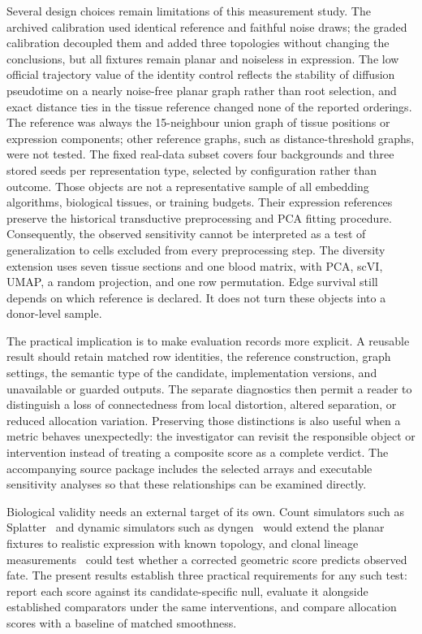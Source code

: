 \documentclass[11pt]{article}
\begin{document}
Several design choices remain limitations of this measurement study. The archived calibration used identical reference and faithful noise draws; the graded calibration decoupled them and added three topologies without changing the conclusions, but all fixtures remain planar and noiseless in expression. The low official trajectory value of the identity control reflects the stability of diffusion pseudotime on a nearly noise-free planar graph rather than root selection, and exact distance ties in the tissue reference changed none of the reported orderings. The reference was always the 15-neighbour union graph of tissue positions or expression components; other reference graphs, such as distance-threshold graphs, were not tested. The fixed real-data subset covers four backgrounds and three stored seeds per representation type, selected by configuration rather than outcome. Those objects are not a representative sample of all embedding algorithms, biological tissues, or training budgets. Their expression references preserve the historical transductive preprocessing and PCA fitting procedure. Consequently, the observed sensitivity cannot be interpreted as a test of generalization to cells excluded from every preprocessing step. The diversity extension uses seven tissue sections and one blood matrix, with PCA, scVI, UMAP, a random projection, and one row permutation. Edge survival still depends on which reference is declared. It does not turn these objects into a donor-level sample.

The practical implication is to make evaluation records more explicit. A reusable result should retain matched row identities, the reference construction, graph settings, the semantic type of the candidate, implementation versions, and unavailable or guarded outputs. The separate diagnostics then permit a reader to distinguish a loss of connectedness from local distortion, altered separation, or reduced allocation variation. Preserving those distinctions is also useful when a metric behaves unexpectedly: the investigator can revisit the responsible object or intervention instead of treating a composite score as a complete verdict. The accompanying source package includes the selected arrays and executable sensitivity analyses so that these relationships can be examined directly.

Biological validity needs an external target of its own. Count simulators such as Splatter~\cite{zappia2017splatter} and dynamic simulators such as dyngen~\cite{cannoodt2021dyngen} would extend the planar fixtures to realistic expression with known topology, and clonal lineage measurements~\cite{weinreb2020lineage} could test whether a corrected geometric score predicts observed fate. The present results establish three practical requirements for any such test: report each score against its candidate-specific null, evaluate it alongside established comparators under the same interventions, and compare allocation scores with a baseline of matched smoothness.
\end{document}
